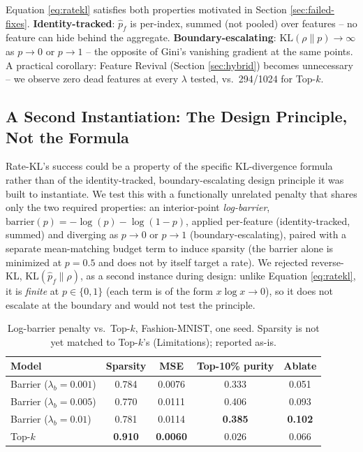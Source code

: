 \documentclass[11pt,twocolumn]{article}
\begin{document}
Equation \ref{eq:ratekl} satisfies both properties motivated in Section \ref{sec:failed-fixes}. \textbf{Identity-tracked}: $\hat p_f$ is per-index, summed (not pooled) over features -- no feature can hide behind the aggregate. \textbf{Boundary-escalating}: $\mathrm{KL}(\rho\|p)\to\infty$ as $p\to0$ or $p\to1$ -- the opposite of Gini's vanishing gradient at the same points. A practical corollary: Feature Revival (Section \ref{sec:hybrid}) becomes unnecessary -- we observe zero dead features at every $\lambda$ tested, vs.\ 294/1024 for Top-$k$.

\subsection{A Second Instantiation: The Design Principle, Not the Formula}
\label{sec:barrier}
Rate-KL's success could be a property of the specific KL-divergence formula rather than of the identity-tracked, boundary-escalating design principle it was built to instantiate. We test this with a functionally unrelated penalty that shares only the two required properties: an interior-point \emph{log-barrier}, $\mathrm{barrier}(p) = -\log(p) - \log(1-p)$, applied per-feature (identity-tracked, summed) and diverging as $p\to0$ or $p\to1$ (boundary-escalating), paired with a separate mean-matching budget term to induce sparsity (the barrier alone is minimized at $p{=}0.5$ and does not by itself target a rate). We rejected reverse-KL, $\mathrm{KL}(\hat p_f\|\rho)$, as a second instance during design: unlike Equation \ref{eq:ratekl}, it is \emph{finite} at $p{\in}\{0,1\}$ (each term is of the form $x\log x \to 0$), so it does not escalate at the boundary and would not test the principle.

\begin{table}[h]
\centering
\caption{Log-barrier penalty vs.\ Top-$k$, Fashion-MNIST, one seed. Sparsity is not yet matched to Top-$k$'s (Limitations); reported as-is.}
\label{tab:barrier}
\begin{tabular}{@{}lcccc@{}}
\toprule
Model & Sparsity & MSE & Top-10\% purity & Ablate \\ \midrule
Barrier ($\lambda_b{=}0.001$) & 0.784 & 0.0076 & 0.333 & 0.051 \\
Barrier ($\lambda_b{=}0.005$) & 0.770 & 0.0111 & 0.406 & 0.093 \\
Barrier ($\lambda_b{=}0.01$) & 0.781 & 0.0114 & \textbf{0.385} & \textbf{0.102} \\
Top-$k$ & \textbf{0.910} & \textbf{0.0060} & 0.026 & 0.066 \\ \bottomrule
\end{tabular}
\end{table}
\end{document}
